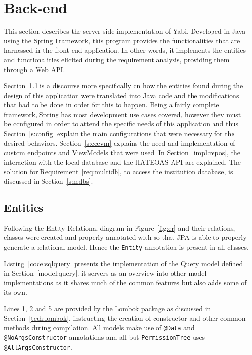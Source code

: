 \section{Back-end}\label{cha:implementation:sec:back-end}
This section describes the server-side implementation of \gls{Yabi}. Developed in Java using the Spring Framework, this program provides the functionalities that are harnessed in the front-end application. In other words, it implements the entities and functionalities elicited during the requirement analysis, providing them through a Web \gls{API}.

Section~\ref{s:entity} is a discourse more specifically on how the entities found during the design of this application were translated into Java code and the modifications that had to be done in order for this to happen. Being a fairly complete framework, Spring has most development use cases covered, however they must be configured in order to attend the specific needs of this application and thus Section~\ref{s:config} explain the main configurations that were necessary for the desired behaviors. Section~\ref{s:ccevm} explains the need and implementation of custom endpoints and ViewModels that were used. In Section~\ref{impl:repos}, the interaction with the local database and the \gls{HATEOAS} \gls{API} are explained. The solution for Requirement~\ref{req:multidb}, to access the institution database, is discussed in Section~\ref{s:mdbs}.

\subsection{Entities}\label{s:entity}
Following the Entity-Relational diagram in Figure~\ref{fig:er} and their relations, classes were created and properly annotated with so that \gls{JPA} is able to properly generate a relational model. Hence the \texttt{Entity} annotation is present in all classes.

Listing~\ref{code:sqlquery} presents the implementation of the Query model defined in Section~\ref{model:query}, it servers as an overview into other model implementations as it shares much of the common features but also adds some of its own.

Lines 1, 2 and 5 are provided by the Lombok package as discussed in Section~\ref{tech:lombok}, instructing the creation of constructor and other common methods during compilation. All models make use of \texttt{@Data} and \texttt{@NoArgsConstructor} annotations and all but \texttt{PermissionTree} uses \texttt{@AllArgsConstructor}.

